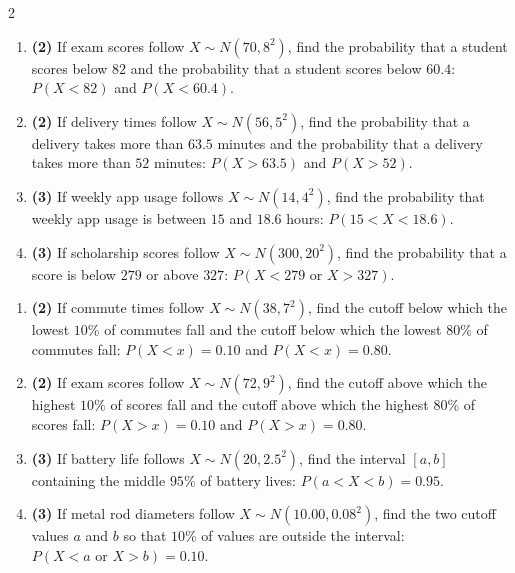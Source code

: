 \begin{multicols}{2}
		\vspace{0.25cm}
		\vspace{-0.3cm}
		
		\begin{enumerate}[label=\textbf{\alph*)}]
			\item \textbf{(2)} If exam scores follow \(X\sim N(70,8^2)\), find the probability that a student scores below \(82\) and the probability that a student scores below \(60.4\): \(P(X<82)\) and \(P(X<60.4)\).
			
			\item \textbf{(2)} If delivery times follow \(X\sim N(56,5^2)\), find the probability that a delivery takes more than \(63.5\) minutes and the probability that a delivery takes more than \(52\) minutes: \(P(X>63.5)\) and \(P(X>52)\).
			
			\item \textbf{(3)} If weekly app usage follows \(X\sim N(14,4^2)\), find the probability that weekly app usage is between \(15\) and \(18.6\) hours: \(P(15<X<18.6)\).
			
			\item \textbf{(3)} If scholarship scores follow \(X\sim N(300,20^2)\), find the probability that a score is below \(279\) or above \(327\): \(P(X<279\text{ or }X>327)\).
		\end{enumerate}
		
		\vspace{0.25cm}
		\vspace{-0.3cm}
		
		\begin{enumerate}[label=\textbf{\alph*)}]
			\item \textbf{(2)} If commute times follow \(X\sim N(38,7^2)\), find the cutoff below which the lowest \(10\%\) of commutes fall and the cutoff below which the lowest \(80\%\) of commutes fall: \(P(X<x)=0.10\) and \(P(X<x)=0.80\).
			
			\item \textbf{(2)} If exam scores follow \(X\sim N(72,9^2)\), find the cutoff above which the highest \(10\%\) of scores fall and the cutoff above which the highest \(80\%\) of scores fall: \(P(X>x)=0.10\) and \(P(X>x)=0.80\).
			
			\item \textbf{(3)} If battery life follows \(X\sim N(20,2.5^2)\), find the interval \([a,b]\) containing the middle \(95\%\) of battery lives: \(P(a<X<b)=0.95\).
			
			\item \textbf{(3)} If metal rod diameters follow \(X\sim N(10.00,0.08^2)\), find the two cutoff values \(a\) and \(b\) so that \(10\%\) of values are outside the interval: \(P(X<a\text{ or }X>b)=0.10\).
		\end{enumerate}
		
	\end{multicols}
	
